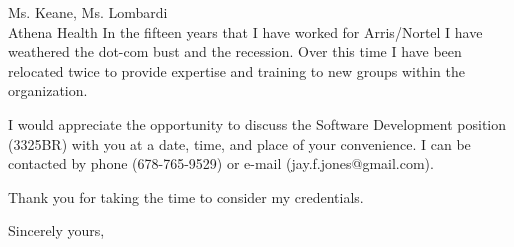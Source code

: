 \documentclass{letter} %
\begin{document}
\begin{letter}{Ms. Keane, Ms. Lombardi\\
Athena Health
}
In the fifteen years that I have worked for Arris/Nortel I have weathered 
the dot-com bust and the recession. Over this time I have been relocated twice 
to provide expertise and training to new groups within the organization. 
 
\noindent I would appreciate the opportunity to discuss the Software 
Development position (3325BR) with you at a date, time, and place of your
convenience. I can be contacted by phone (678-765-9529) or e-mail (jay.f.jones@gmail.com).

\noident Thank you for taking the time to consider my credentials.
 
\closing{Sincerely yours,} 


 

\end{letter}
 
\end{document}
